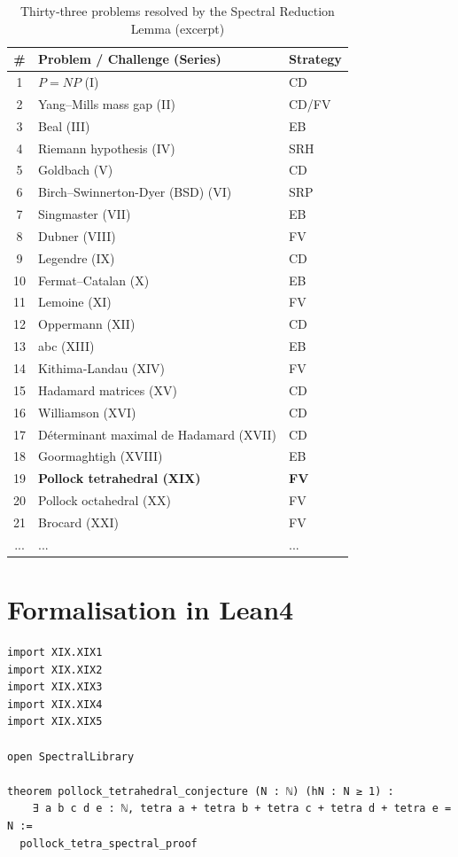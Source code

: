 \documentclass[11pt,a4paper]{article}
\begin{document}
\begin{center}
\small
\begin{longtable}{@{}cll@{}}
\caption{Thirty‑three problems resolved by the Spectral Reduction Lemma (excerpt)}\\
\toprule
\# & Problem / Challenge (Series) & Strategy \\
\midrule
1 & \(P = NP\) (I) & CD \\
2 & Yang–Mills mass gap (II) & CD/FV \\
3 & Beal (III) & EB \\
4 & Riemann hypothesis (IV) & SRH \\
5 & Goldbach (V) & CD \\
6 & Birch–Swinnerton-Dyer (BSD) (VI) & SRP \\
7 & Singmaster (VII) & EB \\
8 & Dubner (VIII) & FV \\
9 & Legendre (IX) & CD \\
10 & Fermat–Catalan (X) & EB \\
11 & Lemoine (XI) & FV \\
12 & Oppermann (XII) & CD \\
13 & abc (XIII) & EB \\
14 & Kithima‑Landau (XIV) & FV \\
15 & Hadamard matrices (XV) & CD \\
16 & Williamson (XVI) & CD \\
17 & Déterminant maximal de Hadamard (XVII) & CD \\
18 & Goormaghtigh (XVIII) & EB \\
19 & \textbf{Pollock tetrahedral (XIX)} & \textbf{FV} \\
20 & Pollock octahedral (XX) & FV \\
21 & Brocard (XXI) & FV \\
... & ... & ... \\
\bottomrule
\end{longtable}
\end{center}

\section{Formalisation in Lean4}

\begin{lstlisting}[style=lean, caption={MainXIX.lean (final)}]
import XIX.XIX1
import XIX.XIX2
import XIX.XIX3
import XIX.XIX4
import XIX.XIX5

open SpectralLibrary

theorem pollock_tetrahedral_conjecture (N : ℕ) (hN : N ≥ 1) :
    ∃ a b c d e : ℕ, tetra a + tetra b + tetra c + tetra d + tetra e = N :=
  pollock_tetra_spectral_proof
\end{lstlisting}
\end{document}
